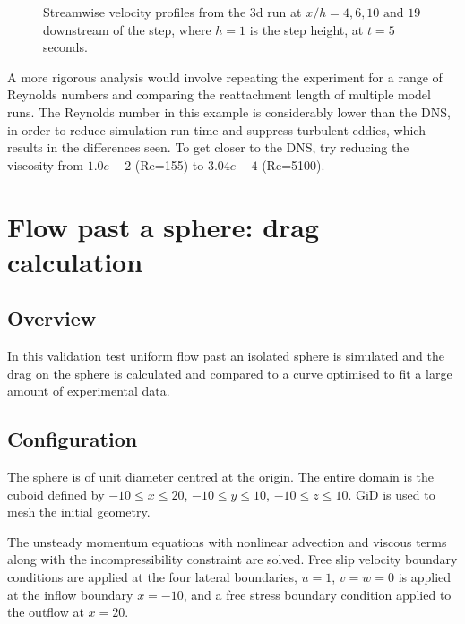 \begin{figure}
\centering
{}
\caption{Streamwise velocity profiles from the 3d run at $x/h=4, 6, 10 \text{ and } 19$
downstream of the step, where $h=1$ is the step height, at $t=5$ seconds.}
\label{Fig:UProfiles3d}
\end{figure}

A more rigorous analysis would involve repeating the experiment for a range of
Reynolds numbers and comparing the reattachment length of multiple model runs.
The Reynolds number in this example is considerably lower than the DNS, 
in order to reduce simulation run time and suppress turbulent eddies, which
results in the differences seen. To get closer to the DNS, try reducing the
viscosity from $1.0e-2$ (Re=155) to $3.04e-4$ (Re=5100).


\section{Flow past a sphere: drag calculation}
\label{sec:flow_past_sphere}
\subsection{Overview}
In this validation test uniform flow past an isolated sphere is simulated
and the drag on the sphere is calculated and compared to a curve optimised
to fit a large amount of experimental data.

\subsection{Configuration}
The sphere is of unit diameter centred at the origin. The entire domain is
the cuboid defined by $-10\le x\le 20$, $-10\le y\le 10$, $-10\le z\le 10$.
GiD is used to mesh the initial geometry.

The unsteady momentum equations with nonlinear advection and viscous terms
along with the incompressibility constraint are solved. Free slip velocity
boundary conditions are applied at the four lateral boundaries, $u=1$, $v=w=0$ is
applied at the inflow boundary $x=-10$, and a free stress boundary condition
applied to the outflow at $x=20$. 

